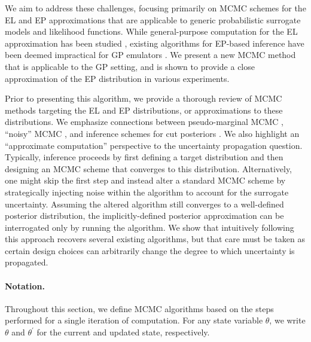 \documentclass[12pt]{article}
\begin{document}
We aim to address these challenges, focusing primarily on MCMC schemes for the EL
and EP approximations that are applicable to generic probabilistic surrogate models 
and likelihood functions. While general-purpose computation for the EL approximation 
has been studied \citep{garegnani2021NoisyMCMC}, existing algorithms for EP-based 
inference have been deemed impractical for GP emulators \citep{VehtariParallelGP,StuartTeck2}.
We present a new MCMC method that is applicable to the GP setting, and is
shown to provide a close approximation of the EP distribution in various experiments.

Prior to presenting this algorithm, we provide a thorough review of MCMC methods
targeting the EL and EP distributions, or approximations to these distributions. 
We emphasize connections between pseudo-marginal MCMC \citep{pseudoMarginalMCMC}, 
``noisy'' MCMC \citep{noisyMCMC}, and inference schemes for cut 
posteriors \citep{PlummerCut}. We also highlight an ``approximate computation'' 
perspective to the uncertainty propagation question. Typically, inference proceeds
by first defining a target distribution and then designing an MCMC scheme that
converges to this distribution. Alternatively, one might skip the first step and instead 
alter a standard MCMC scheme by strategically injecting noise within the 
algorithm to account for the surrogate uncertainty. Assuming the altered algorithm 
still converges to a well-defined posterior distribution, the implicitly-defined posterior 
approximation can be interrogated only by running the algorithm.
We show that intuitively following this approach recovers several existing algorithms, 
but that care must be taken as certain design choices can arbitrarily change the 
degree to which uncertainty is propagated.

\paragraph{Notation.} Throughout this section, we define MCMC algorithms
based on the steps performed for a single iteration of computation. For any 
state variable $\theta$, we write $\theta$ and $\theta^\prime$ for the current
and updated state, respectively.
\end{document}
